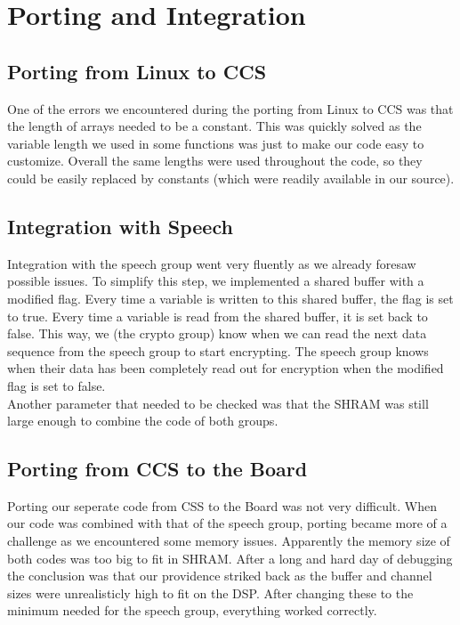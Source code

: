 \documentclass[a4paper]{article}
\begin{document}
\section{Porting and Integration}

\subsection{Porting from Linux to CCS}

One of the errors we encountered during the porting from Linux to CCS was that the length of arrays needed to be a constant. This was quickly solved as the variable length we used in some functions was just to make our code easy to customize. Overall the same lengths were used throughout the code, so they could be easily replaced by constants (which were readily available in our source).

\subsection{Integration with Speech}

Integration with the speech group went very fluently as we already foresaw possible issues. To simplify this step, we implemented a shared buffer with a modified flag. Every time a variable is written to this shared buffer, the flag is set to true. Every time a variable is read from the shared buffer, it is set back to false. This way, we (the crypto group) know when we can read the next data sequence from the speech group to start encrypting. The speech group knows when their data has been completely read out for encryption when the modified flag is set to false.\\

Another parameter that needed to be checked was that the SHRAM was still large enough to combine the code of both groups.

\subsection{Porting from CCS to the Board}

Porting our seperate code from CSS to the Board was not very difficult. When our code was combined with that of the speech group, porting became more of a challenge as we encountered some memory issues. Apparently the memory size of both codes was too big to fit in SHRAM. After a long and hard day of debugging the conclusion was that our providence striked back as the buffer and channel sizes were unrealisticly high to fit on the DSP. After changing these to the minimum needed for the speech group, everything worked correctly.
\end{document}

